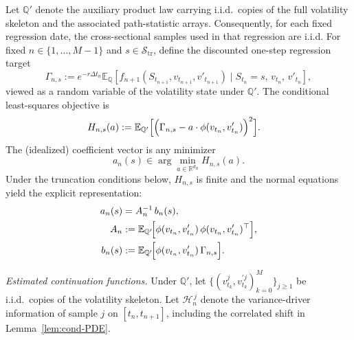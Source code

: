\documentclass[10pt]{article}
\theoremstyle{plain}
\theoremstyle{definition}
\theoremstyle{remark}
\begin{document}
Let $\mathbb{Q}'$ denote the auxiliary product law carrying i.i.d.\ copies of the full volatility skeleton and
the associated path-statistic arrays. Consequently, for each fixed regression date, the cross-sectional samples
used in that regression are i.i.d. For fixed $n\in\{1,\dots,M-1\}$ and
$s\in\mathcal S_{\mathrm{tr}}$, define the discounted one-step regression target
\[
\Gamma_{n,s}
:=e^{-r\Delta t_n}
\mathbb{E}_{\mathbb{Q}}\!\left[
f_{n+1}(S_{t_{n+1}},v_{t_{n+1}},v'_{t_{n+1}})
\mid S_{t_n}=s,\,v_{t_n},\,v'_{t_n}
\right],
\]
viewed as a random variable of the volatility state under $\mathbb{Q}'$. The conditional least-squares objective is
\begin{equation}
\begin{aligned}
H_{n,s}(a)
&:=
\mathbb{E}_{\mathbb{Q}'}
\Bigl[
\Bigl(
\Gamma_{n,s}
- a\cdot \phi(v_{t_n},v'_{t_n})
\Bigr)^2
\Bigr].
\end{aligned}
\label{eq:Hns}
\end{equation}
The (idealized) coefficient vector is any minimizer
\[
a_n(s)\in \arg\min_{a\in\mathbb{R}^{d_B}} H_{n,s}(a).
\]
Under the truncation conditions below, $H_{n,s}$ is finite and the normal equations yield the explicit
representation:
\begin{equation}
\begin{aligned}
a_n(s)&=A_n^{-1}\, b_n(s),\\
A_n&:= \mathbb{E}_{\mathbb{Q}'}\!\Bigl[
\phi(v_{t_n},v'_{t_n})\,\phi(v_{t_n},v'_{t_n})^\top
\Bigr],\\
b_n(s)&:= \mathbb{E}_{\mathbb{Q}'}\!\Bigl[
\phi(v_{t_n},v'_{t_n})\,
\Gamma_{n,s}
\Bigr].
\end{aligned}
\label{eq:ideal_coeff_normal_eq}
\end{equation}

\noindent\emph{Estimated continuation functions.}
Under $\mathbb{Q}'$, let
$\{(v^j_{t_k},v^{\prime j}_{t_k})_{k=0}^M\}_{j\ge 1}$ be i.i.d.\ copies of the volatility skeleton. Let
$\mathcal H_n^{\,j}$ denote the variance-driver information of sample $j$ on $[t_n,t_{n+1}]$, including the
correlated shift in Lemma~\ref{lem:cond-PDE}.
\end{document}
